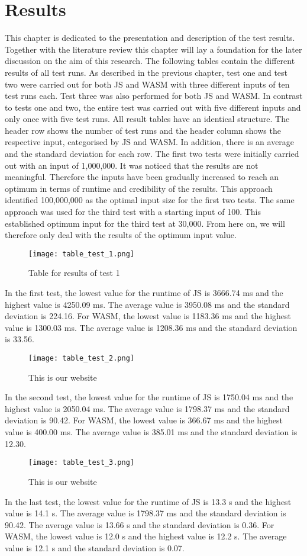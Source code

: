\newpage
\section{Results} \label{results}
This chapter is dedicated to the presentation and description of the test results. Together with the literature review this chapter will lay a foundation for the later discussion on the aim of this research. The following tables contain the different results of all test runs. As described in the previous chapter, test one and test two were carried out for both JS and WASM with three different inputs of ten test runs each. Test three was also performed for both JS and WASM. In contrast to tests one and two, the entire test was carried out with five different inputs and only once with five test runs.
All result tables have an identical structure. The header row shows the number of test runs and the header column shows the respective input, categorised by JS and WASM. In addition, there is an average and the standard deviation for each row. The first two tests were initially carried out with an input of 1,000,000. It was noticed that the results are not meaningful. Therefore the inputs have been gradually increased to reach an optimum in terms of runtime and credibility of the results. This approach identified 100,000,000 as the optimal input size for the first two tests. The same approach was used for the third test with a starting input of 100. This established optimum input for the third test at 30,000. From here on, we will therefore only deal with the results of the optimum input value.
\begin{figure}[H]
    \centering
    \caption[]{Table for results of test 1}
	\label{fig:tableTest1}
    \texttt{[image: table\_test\_1.png]}
\end{figure}
In the first test, the lowest value for the runtime of JS is 3666.74 ms and the highest value is 4250.09 ms. The average value is 3950.08 ms and the standard deviation is 224.16. For WASM, the lowest value is 1183.36 ms and the highest value is 1300.03 ms. The average value is 1208.36 ms and the standard deviation is 33.56.
\begin{figure}[H]
    \centering
    \caption[]{This is our website}
	\label{fig:tableTest2}
    \texttt{[image: table\_test\_2.png]}
\end{figure}
In the second test, the lowest value for the runtime of JS is 1750.04 ms and the highest value is 2050.04 ms. The average value is 1798.37 ms and the standard deviation is 90.42. For WASM, the lowest value is 366.67 ms and the highest value is 400.00 ms. The average value is 385.01 ms and the standard deviation is 12.30.
\begin{figure}[H]
    \centering
    \caption[]{This is our website}
	\label{fig:tableTest3}
    \texttt{[image: table\_test\_3.png]}
\end{figure}
In the last test, the lowest value for the runtime of JS is 13.3 s and the highest value is 14.1 s. The average value is 1798.37 ms and the standard deviation is 90.42. The average value is 13.66 s and the standard deviation is 0.36. For WASM, the lowest value is 12.0 s and the highest value is 12.2 s. The average value is 12.1 s and the standard deviation is 0.07.